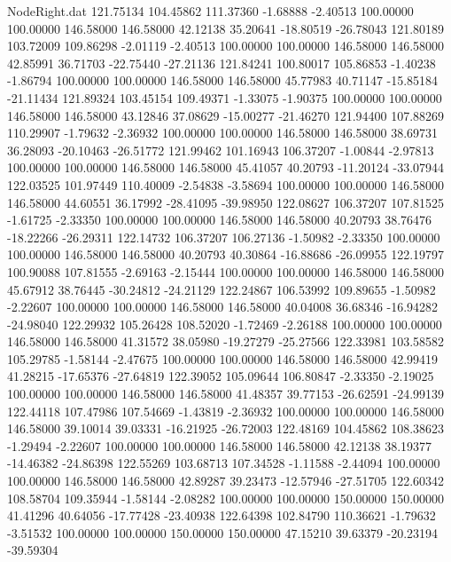 \begin{filecontents}{NodeRight.dat}
 121.75134  104.45862  111.37360    -1.68888   -2.40513  100.00000  100.00000  146.58000  146.58000   42.12138   35.20641  -18.80519  -26.78043
 121.80189  103.72009  109.86298    -2.01119   -2.40513  100.00000  100.00000  146.58000  146.58000   42.85991   36.71703  -22.75440  -27.21136
 121.84241  100.80017  105.86853    -1.40238   -1.86794  100.00000  100.00000  146.58000  146.58000   45.77983   40.71147  -15.85184  -21.11434
 121.89324  103.45154  109.49371    -1.33075   -1.90375  100.00000  100.00000  146.58000  146.58000   43.12846   37.08629  -15.00277  -21.46270
 121.94400  107.88269  110.29907    -1.79632   -2.36932  100.00000  100.00000  146.58000  146.58000   38.69731   36.28093  -20.10463  -26.51772
 121.99462  101.16943  106.37207    -1.00844   -2.97813  100.00000  100.00000  146.58000  146.58000   45.41057   40.20793  -11.20124  -33.07944
 122.03525  101.97449  110.40009    -2.54838   -3.58694  100.00000  100.00000  146.58000  146.58000   44.60551   36.17992  -28.41095  -39.98950
 122.08627  106.37207  107.81525    -1.61725   -2.33350  100.00000  100.00000  146.58000  146.58000   40.20793   38.76476  -18.22266  -26.29311
 122.14732  106.37207  106.27136    -1.50982   -2.33350  100.00000  100.00000  146.58000  146.58000   40.20793   40.30864  -16.88686  -26.09955
 122.19797  100.90088  107.81555    -2.69163   -2.15444  100.00000  100.00000  146.58000  146.58000   45.67912   38.76445  -30.24812  -24.21129
 122.24867  106.53992  109.89655    -1.50982   -2.22607  100.00000  100.00000  146.58000  146.58000   40.04008   36.68346  -16.94282  -24.98040
 122.29932  105.26428  108.52020    -1.72469   -2.26188  100.00000  100.00000  146.58000  146.58000   41.31572   38.05980  -19.27279  -25.27566
 122.33981  103.58582  105.29785    -1.58144   -2.47675  100.00000  100.00000  146.58000  146.58000   42.99419   41.28215  -17.65376  -27.64819
 122.39052  105.09644  106.80847    -2.33350   -2.19025  100.00000  100.00000  146.58000  146.58000   41.48357   39.77153  -26.62591  -24.99139
 122.44118  107.47986  107.54669    -1.43819   -2.36932  100.00000  100.00000  146.58000  146.58000   39.10014   39.03331  -16.21925  -26.72003
 122.48169  104.45862  108.38623    -1.29494   -2.22607  100.00000  100.00000  146.58000  146.58000   42.12138   38.19377  -14.46382  -24.86398
 122.55269  103.68713  107.34528    -1.11588   -2.44094  100.00000  100.00000  146.58000  146.58000   42.89287   39.23473  -12.57946  -27.51705
 122.60342  108.58704  109.35944    -1.58144   -2.08282  100.00000  100.00000  150.00000  150.00000   41.41296   40.64056  -17.77428  -23.40938
 122.64398  102.84790  110.36621    -1.79632   -3.51532  100.00000  100.00000  150.00000  150.00000   47.15210   39.63379  -20.23194  -39.59304

\end{filecontents}
